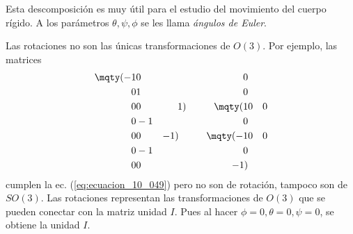 Esta descomposición es muy útil para el estudio del movimiento del cuerpo rígido. A los parámetros $\theta, \psi, \phi$ se les llama \emph{ángulos de Euler}.
\par
Las rotaciones no son las únicas transformaciones de $O(3)$. Por ejemplo, las matrices
\begin{align}
\mqty(-1 & 0 & 0 \\ 0 & 1 & 0 \\ 0 & 0 & 1) \hspace{1cm} \mqty(1 & 0 & 0 \\ 0 & -1 & 0 \\ 0 & 0 & -1) \hspace{1cm} \mqty(-1 & 0 & 0 \\ 0 & -1 & 0 \\ 0 & 0 & -1)
\label{eq:ecuacion_10_061}
\end{align}
cumplen la ec. (\ref{eq:ecuacion_10_049}) pero no son de rotación, tampoco son de $SO(3)$. Las rotaciones representan las transformaciones de $O(3)$ que se pueden conectar con la matriz unidad $I$. Pues al hacer $\phi = 0, \theta = 0, \psi = 0$, se obtiene la unidad $I$.
